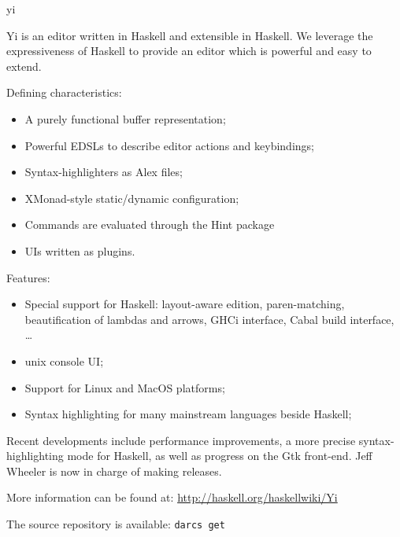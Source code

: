 \begin{hcarentry}[updated]{yi}
\label{yi}
\makeheader

Yi is an editor written in Haskell and extensible in Haskell. We leverage the
expressiveness of Haskell to provide an editor which is powerful and easy to
extend.

Defining characteristics:
\begin{itemize}
\item A purely functional buffer representation;
\item Powerful EDSLs to describe editor actions and keybindings;
\item Syntax-highlighters as Alex files;
\item XMonad-style static/dynamic configuration;
\item Commands are evaluated through the Hint package
\item UIs written as plugins.
\end{itemize}

Features:
\begin{itemize}
\item Special support for Haskell: layout-aware edition, paren-matching, beautification of lambdas and arrows, GHCi interface, Cabal build interface, \dots
\item unix console UI;
\item Support for Linux and MacOS platforms;
\item Syntax highlighting for many mainstream languages beside Haskell;
\end{itemize}

Recent developments include performance improvements, a more precise
syntax-highlighting mode for Haskell, as well as progress on the Gtk
front-end. Jeff Wheeler is now in charge of making releases.

\FurtherReading
\begin{compactitem}
\item More information can be found at:
 \url{http://haskell.org/haskellwiki/Yi}

\item The source repository is available:
 \texttt{darcs get}
\end{compactitem}
\end{hcarentry}
